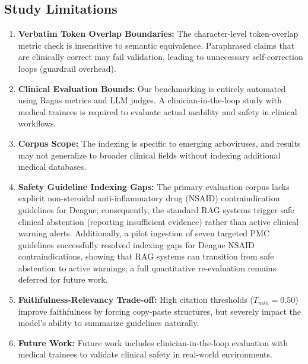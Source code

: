 \subsection{Study Limitations}
\begin{enumerate}
    \item \textbf{Verbatim Token Overlap Boundaries:} The character-level token-overlap metric check is insensitive to semantic equivalence. Paraphrased claims that are clinically correct may fail validation, leading to unnecessary self-correction loops (guardrail overhead).
    \item \textbf{Clinical Evaluation Bounds:} Our benchmarking is entirely automated using Ragas metrics and LLM judges. A clinician-in-the-loop study with medical trainees is required to evaluate actual usability and safety in clinical workflows.
    \item \textbf{Corpus Scope:} The indexing is specific to emerging arboviruses, and results may not generalize to broader clinical fields without indexing additional medical databases.
    \item \textbf{Safety Guideline Indexing Gaps:} The primary evaluation corpus lacks explicit non-steroidal anti-inflammatory drug (NSAID) contraindication guidelines for Dengue; consequently, the standard RAG systems trigger safe clinical abstention (reporting insufficient evidence) rather than active clinical warning alerts. Additionally, a pilot ingestion of seven targeted PMC guidelines successfully resolved indexing gaps for Dengue NSAID contraindications, showing that RAG systems can transition from safe abstention to active warnings; a full quantitative re-evaluation remains deferred for future work.
    \item \textbf{Faithfulness-Relevancy Trade-off:} High citation thresholds ($T_{min} = 0.50$) improve faithfulness by forcing copy-paste structures, but severely impact the model's ability to summarize guidelines naturally. 
    \item \textbf{Future Work:} Future work includes clinician-in-the-loop evaluation with medical trainees to validate clinical safety in real-world environments.
\end{enumerate}
